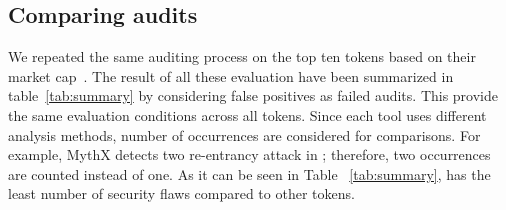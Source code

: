 
\subsection{Comparing audits}
We repeated the same auditing process on the top ten tokens based on their market cap~\cite{EtherScan}. The result of all these evaluation have been summarized in table~\ref{tab:summary} by considering false positives as failed audits. This provide the same evaluation conditions across all tokens. Since each tool uses different analysis methods, number of occurrences are considered for comparisons. For example, MythX detects two re-entrancy attack in \sys; therefore, two occurrences are counted instead of one. As it can be seen in Table ~\ref{tab:summary}, \sys has the least number of security flaws compared to other tokens.

